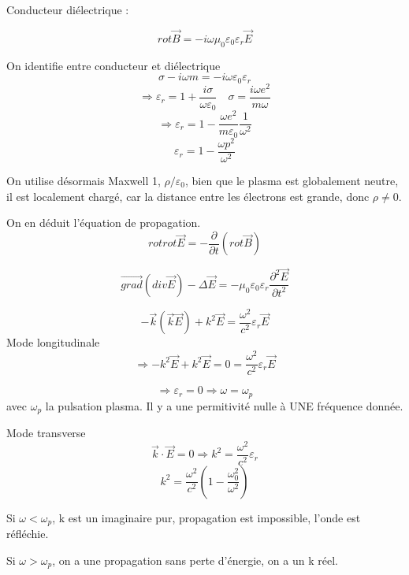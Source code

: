\documentclass[12pt,a4paper]{report}
\begin{document}
Conducteur diélectrique :

\[
	rot \vec{B} = -i \omega \mu_0 \varepsilon_0 \varepsilon_r \vec{E}
\]

On identifie entre conducteur et diélectrique
\[
	\sigma - i \omega m= -i \omega \varepsilon_0 \varepsilon_r
\]
\[
	\Rightarrow \varepsilon_r = 1 + \dfrac{i \sigma}{\omega \varepsilon_0} \quad \sigma = \dfrac{i \omega e^2}{m \omega}
\]
\[
	\Rightarrow \varepsilon_r = 1 - \dfrac{\omega e^2}{m \varepsilon_0} \dfrac{1}{\omega^2}
\]
\[
	\varepsilon_r = 1 - \dfrac{\omega p^2}{\omega^2}
\]

On utilise désormais Maxwell 1, \(\rho / \varepsilon_0\), bien que le plasma est globalement neutre, il est localement chargé, car la distance entre les électrons est grande, donc \(\rho \neq 0\).

On en déduit l'équation de propagation.
\[
	rot rot \vec{E} = -\dfrac{\partial}{\partial t} \left( rot \vec{B} \right)
\]

\[
	\vec{grad}(div \vec{E})  - \Delta \vec{E} = -\mu_0 \varepsilon_0 \varepsilon_r \dfrac{\partial^2 \vec{E}}{\partial t^2}
\]

\[
	-\vec{k} (\vec{k} \vec{E}) + k^2 \vec{E} = \dfrac{\omega^2}{c^2} \varepsilon_r \vec{E}
\]
Mode longitudinale
\[
	\Rightarrow -k^2 \vec{E} + k^2 \vec{E} = 0 = \dfrac{\omega^2}{c^2} \varepsilon_r \vec{E}
\]

\[
	\Rightarrow \varepsilon_r = 0 \Rightarrow \omega = \omega_p
\]
avec \(\omega_p\) la pulsation plasma. Il y a une permitivité nulle à UNE fréquence donnée.

Mode transverse
\[
	\vec{k} \cdot \vec{E} = 0 \Rightarrow k^2 = \dfrac{\omega^2}{c^2} \varepsilon_r 
\]
\[
	k^2 = \dfrac{\omega^2}{c^2} \left( 1 - \dfrac{\omega_0^2}{\omega^2} \right)
\]

Si \(\omega < \omega_p\), k est un imaginaire pur, propagation est impossible, l'onde est réfléchie.

Si \(\omega > \omega_p\), on a une propagation sans perte d'énergie, on a un k réel.
\end{document}
